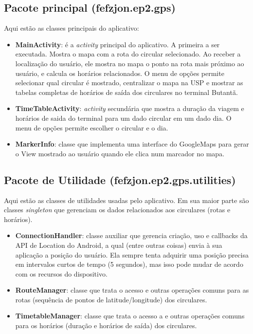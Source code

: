 \subsection{Pacote principal (fefzjon.ep2.gps)}
Aqui estão as classes principais do aplicativo:
\begin{itemize}
    \item \textbf{MainActivity}: é a \textit{activity} principal do aplicativo. A primeira a ser executada. Mostra o mapa com a rota do circular selecionado.
        Ao receber a localização do usuário, ele mostra no mapa o ponto na rota mais próximo ao usuário, e calcula os horários relacionados.
        O menu de opções permite selecionar qual circular é mostrado, centralizar o mapa na USP e mostrar as tabelas completas de horários de saída dos
        circulares no terminal Butantã.
    \item \textbf{TimeTableActivity}: \textit{activity} secundária que mostra a duração da viagem e horários de saida do terminal para um dado circular
        em um dado dia. O menu de opções permite escolher o circular e o dia.
    \item \textbf{MarkerInfo}: classe que implementa uma interface do GoogleMaps para gerar o View mostrado ao usuário quando ele clica num marcador no mapa.
\end{itemize}

\subsection{Pacote de Utilidade (fefzjon.ep2.gps.utilities)}
Aqui estão as classes de utilidades usadas pelo aplicativo. Em sua maior parte são classes \textit{singleton} que
gerenciam os dados relacionados aos circulares (rotas e horários).
\begin{itemize}
    \item \textbf{ConnectionHandler}: classe auxiliar que gerencia criação, uso e callbacks da API de Location do Android, a qual (entre outras coisas)
        envia à sua aplicação a posição do usuário. Ela sempre tenta adquirir uma posição precisa em intervalos curtos de tempo (5 segundos), mas
        isso pode mudar de acordo com os recursos do dispositivo.
    \item \textbf{RouteManager}: classe que trata o acesso e outras operações comuns para as rotas (sequência de pontos de latitude/longitude) dos circulares.
    \item \textbf{TimetableManager}: classe que trata o acesso a e outras operações comuns para os horários (duração e horários de saída) dos circulares.
\end{itemize}

